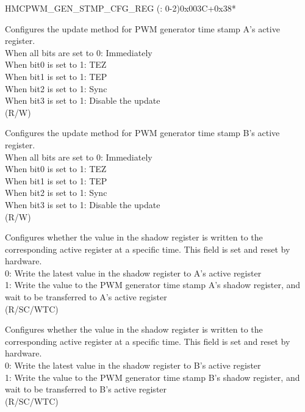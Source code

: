 \begin{register}{H}{MCPWM\_GEN\_STMP\_CFG\_REG (: 0-2)}{0x003C+0x38*}\label{regdesc:MCPWMGENNSTMPCFGREG}
%
%
%
%
%
\regnewline%
\begin{regdesc}\begin{reglist}
\label{fielddesc:MCPWMCMPRNAUPMETHOD}\item [MCPWM\_CMPR\regindex{n}\_A\_UPMETHOD] Configures the update method for PWM generator time stamp A's active register.
\\When all bits are set to 0: Immediately
\\When bit0 is set to 1: TEZ
\\When bit1 is set to 1: TEP
\\When bit2 is set to 1: Sync
\\When bit3 is set to 1: Disable the update
\\(R/W)
\label{fielddesc:MCPWMCMPRNBUPMETHOD}\item [MCPWM\_CMPR\regindex{n}\_B\_UPMETHOD] Configures the update method for PWM generator time stamp B's active register.
\\When all bits are set to 0: Immediately
\\When bit0 is set to 1: TEZ
\\When bit1 is set to 1: TEP
\\When bit2 is set to 1: Sync
\\When bit3 is set to 1: Disable the update
\\(R/W)
\label{fielddesc:MCPWMCMPRNASHDWFULL}\item [MCPWM\_CMPR\regindex{n}\_A\_SHDW\_FULL] Configures whether the value in the shadow register is written to the corresponding active register at a specific time. This field is set and reset by hardware. \\
0: Write the latest value in the shadow register to A's active register \\
1: Write the value to the PWM generator time stamp A's shadow register, and wait to be transferred to A's active register \\
(R/SC/WTC)
\label{fielddesc:MCPWMCMPRNBSHDWFULL}\item [MCPWM\_CMPR\regindex{n}\_B\_SHDW\_FULL] Configures whether the value in the shadow register is written to the corresponding active register at a specific time. This field is set and reset by hardware. \\
0: Write the latest value in the shadow register to B's active register \\
1: Write the value to the PWM generator time stamp B's shadow register, and wait to be transferred to B's active register \\
(R/SC/WTC)
\end{reglist}\end{regdesc}
\end{register}


